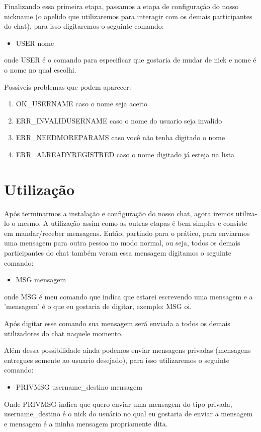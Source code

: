 \documentclass{abnt}
\begin{document}
	Finalizando essa primeira etapa, passamos a etapa de configuração do nosso nickname (o apelido que utilizaremos para interagir com os demais participantes do chat), para isso digitaremos o seguinte comando:
	\begin{itemize}
		\item USER nome	
	\end{itemize}
	onde USER é o comando para especificar que gostaria de mudar de nick e nome é o nome no qual escolhi.

	Possiveis problemas que podem aparecer:
	\begin{enumerate}
		
		\item  OK\_USERNAME caso o nome seja aceito
		\item  ERR\_INVALIDUSERNAME caso o nome do usuario seja invalido
		\item  ERR\_NEEDMOREPARAMS caso você não tenha digitado o nome
		\item  ERR\_ALREADYREGISTRED caso o nome digitado já esteja na lista	
	\end{enumerate}
	
	\section{Utilização}		
	Após terminarmos a instalação e configuração do nosso chat, agora iremos utiliza-lo o mesmo. A utilização assim como as outras etapas é bem simples e consiste em mandar/receber mensagens.
	Então, partindo para o prático, para enviarmos uma mensagem para outra pessoa no modo normal, ou seja, todos os demais participantes do chat também veram essa mensagem digitamos o seguinte comando:
	\begin{itemize}
		\item MSG mensagem 	
	\end{itemize}
	onde MSG é meu comando que indica que estarei escrevendo uma mensagem e a 'mensagem' é o que eu gostaria de digitar, exemplo: MSG oi.
	
	Após digitar esse comando sua mensagem será enviada a todos os demais utilizadores do chat naquele momento.
	
	Além dessa possibilidade ainda podemos enviar mensagens privadas (mensagens entregues somente ao usuario desejado), para isso utilizaremos o seguinte comando:
	\begin{itemize}
		\item PRIVMSG username\_destino mensagem
	\end{itemize}
	Onde PRIVMSG indica que quero enviar uma mensagem do tipo privada, username\_destino é o nick do usuário no qual eu gostaria de enviar a mensagem e mensagem é a minha mensagem propriamente dita.
\end{document}
